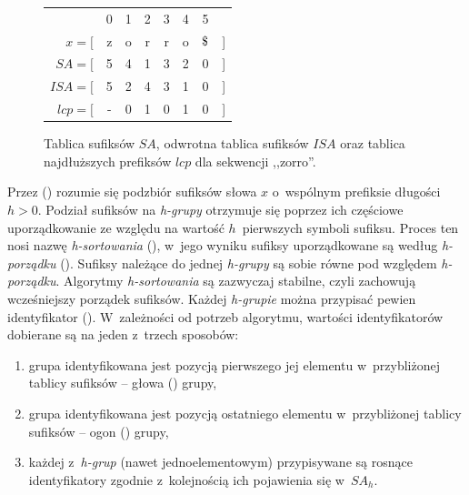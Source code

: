 \begin{figure}[t]
    \begin{center}        
        \begin{tabular}{ r c c c c c c l}                           
                           & 0 & 1 & 2 & 3 & 4 &  5   &   \\ \cmidrule{2-7}
                   $x = [$ & z & o & r & r & o & $\dollar$ & ] \\ 
         $\mathit{SA} = [$ & 5 & 4 & 1 & 3 & 2 &  0   & ] \\ 
        $\mathit{ISA} = [$ & 5 & 2 & 4 & 3 & 1 &  0   & ] \\ 
        $\mathit{lcp} = [$ & - & 0 & 1 & 0 & 1 &  0   & ] \\ 
        \end{tabular}            
    \end{center}                         
\caption{Tablica sufiksów $\mathit{SA}$, odwrotna tablica sufiksów $\mathit{ISA}$
oraz tablica najdłuższych prefiksów $\mathit{lcp}$ dla sekwencji
,,zorro\dollar''.}%
\label{rys:suffix-array}
\end{figure}
    
Przez  () \cite{taxonomy} rozumie się podzbiór
sufiksów słowa $x$ o~wspólnym prefiksie długości $h>0$. 
Podział sufiksów na \emph{h-grupy} otrzymuje się poprzez ich częściowe
uporządkowanie ze względu na wartość $h$~pierwszych symboli sufiksu.
Proces ten nosi nazwę \emph{h-sortowania} (), w~jego
wyniku sufiksy uporządkowane są według \emph{h-porządku}
(). Sufiksy należące do jednej \emph{h-grupy} są sobie
równe pod względem \emph{h-porządku}. Algorytmy \emph{h-sortowania}
są zazwyczaj stabilne, czyli zachowują wcześniejszy porządek sufiksów.
Każdej \emph{h-grupie} można przypisać pewien identyfikator
(). W~zależności od potrzeb algorytmu, wartości
identyfikatorów dobierane są na jeden z~trzech sposobów:
\begin{enumerate}
  \item grupa identyfikowana jest pozycją pierwszego jej elementu w~przybliżonej tablicy sufiksów -- głowa () grupy,
  \item grupa identyfikowana jest pozycją ostatniego elementu w~przybliżonej
   tablicy sufiksów -- ogon () grupy,
  \item  każdej z~\emph{h-grup} (nawet jednoelementowym) przypisywane są
  rosnące identyfikatory zgodnie z~kolejnością ich pojawienia się w~$\textit{SA}_h$.
\end{enumerate}

